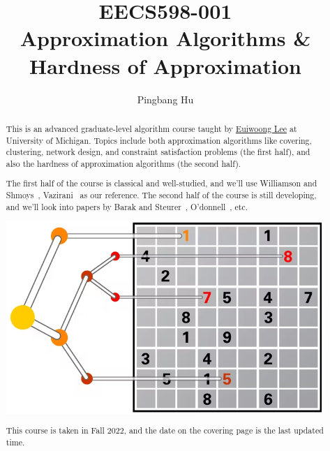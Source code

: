 \documentclass[a4paper]{report}
\author{Pingbang Hu}
\title{EECS598-001\\Approximation Algorithms \& Hardness of Approximation}
\begin{document}
\maketitle

\begin{abstract}
	This is an advanced graduate-level algorithm course taught by \href{https://web.eecs.umich.edu/~euiwoong/}{Euiwoong Lee} at University of Michigan. Topics include both approximation algorithms like covering, clustering, network design, and constraint satisfaction problems (the first half), and also the hardness of approximation algorithms (the second half).

	The first half of the course is classical and well-studied, and we'll use Williamson and Shmoys~\cite{williamson2011design}, Vazirani~\cite{vazirani2002approximation} as our reference. The second half of the course is still developing, and we'll look into papers by Barak and Steurer~\cite{https://doi.org/10.48550/arxiv.1404.5236}, O'donnell~\cite{https://doi.org/10.48550/arxiv.2105.10386}, etc.

	\vfill
	\begin{center}
		\includegraphics[width=.8\linewidth]{Figures/cover.png}
	\end{center}
	\vfill
	This course is taken in Fall 2022, and the date on the covering page is the last updated time.
\end{abstract}

\tableofcontents


\newpage
\appendix
\appendixpage



\newpage
\printbibliography
\end{document}
